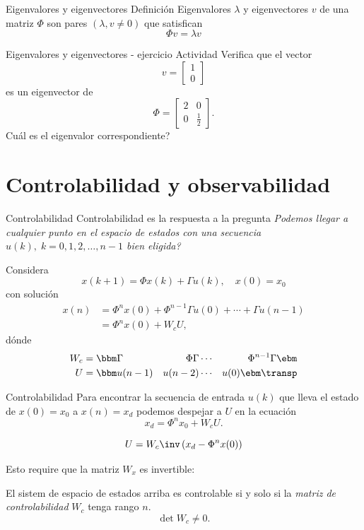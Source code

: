 \documentclass[presentation,aspectratio=1610]{beamer}
\begin{document}
\begin{frame}[label={sec:org13bf8b7}]{Eigenvalores y eigenvectores}
\alert{Definición} Eigenvalores \(\lambda\) y eigenvectores \(v\) de una matriz \(\Phi\) son pares \((\lambda, v \neq 0)\) que satisfican
\[ \Phi v = \lambda v \]
\end{frame}

\begin{frame}[label={sec:org06d542f}]{Eigenvalores y eigenvectores - ejercicio}
\alert{Actividad} Verifica que el vector 
\[ v = \begin{bmatrix}1\\0\end{bmatrix}\]
es un eigenvector de 
\[ \Phi = \begin{bmatrix} 2 & 0\\0 & \frac{1}{2} \end{bmatrix}. \]
Cuál es el eigenvalor correspondiente?
\end{frame}

\section{Controlabilidad y observabilidad}
\label{sec:org054d6ab}

\begin{frame}[label={sec:org2903691}]{Controlabilidad}
Controlabilidad es la respuesta a la pregunta \emph{Podemos llegar a cualquier punto en el espacio de estados con una secuencia \(u(k),\; k=0,1,2,\ldots,n-1\) bien eligida?}

Considera
\[ x(k+1) = \Phi x(k) + \Gamma u(k), \quad x(0)= x_0 \]
con solución
\begin{equation}
\begin{split}
x(n) &= \Phi^nx(0) + \Phi^{n-1}\Gamma u(0) + \cdots + \Gamma u(n-1)\\
     &= \Phi^nx(0) + W_c U, 
\end{split}
\end{equation}
dónde
\begin{align*}
W_c &= \bbm \Gamma & \Phi\Gamma & \cdots & \Phi^{n-1}\Gamma\ebm\\
U &= \bbm u(n-1) & u(n-2) & \cdots & u(0) \ebm\transp
\end{align*}
\end{frame}

\begin{frame}[label={sec:org51f6553}]{Controlabilidad}
Para encontrar la secuencia de entrada \(u(k)\) que lleva el estado de \(x(0)=x_0\) a \(x(n) = x_d\) podemos despejar a \(U\) en la ecuación
\[ x_d = \Phi^nx_0 + W_cU.\]

\[ U = W_c\inv \left(x_d - \Phi^nx(0)\right) \]

Esto require que la matriz \(W_x\) es \alert{invertible}:

El sistem de espacio de estados arriba es controlable si y solo si la \emph{matriz de controlabilidad} \(W_c\)  tenga rango \(n\). 
\[ \det W_c \neq 0.\]
\end{frame}
\end{document}
